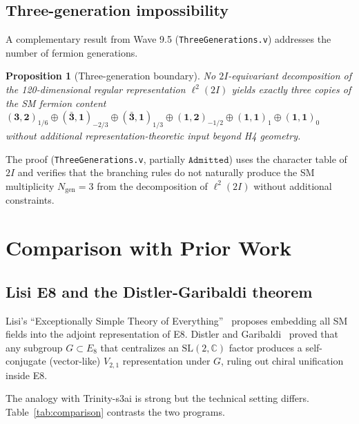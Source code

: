 \documentclass[12pt,a4paper]{article}
\newtheorem{proposition}[theorem]{Proposition}
\newcommand{\TwoI}{2I}
\newcommand{\Admitted}{\texttt{Admitted}}
\begin{document}
\subsection{Three-generation impossibility}
\label{sec:3gen}

A complementary result from Wave 9.5 (\texttt{ThreeGenerations.v}) addresses the
number of fermion generations.

\begin{proposition}[Three-generation boundary]
\label{prop:3gen}
No \(\TwoI\)-equivariant decomposition of the 120-dimensional regular representation
\(\ell^2(\TwoI)\) yields exactly three copies of the SM fermion content
\((\mathbf{3},\mathbf{2})_{1/6} \oplus (\bar{\mathbf{3}},\mathbf{1})_{-2/3}
\oplus (\bar{\mathbf{3}},\mathbf{1})_{1/3} \oplus (\mathbf{1},\mathbf{2})_{-1/2}
\oplus (\mathbf{1},\mathbf{1})_1 \oplus (\mathbf{1},\mathbf{1})_0\) without
additional representation-theoretic input beyond H4 geometry.
\end{proposition}

The proof (\texttt{ThreeGenerations.v}, partially \(\Admitted\)) uses the character table
of \(\TwoI\) and verifies that the branching rules do not naturally produce the SM multiplicity
\(N_{\mathrm{gen}} = 3\) from the decomposition of \(\ell^2(\TwoI)\) without additional
constraints.


\section{Comparison with Prior Work}
\label{sec:comparison}

\subsection{Lisi E8 and the Distler-Garibaldi theorem}

Lisi's ``Exceptionally Simple Theory of Everything''~\cite{Lisi:2007rx} proposes embedding
all SM fields into the adjoint representation of E8. Distler and Garibaldi~\cite{Distler:2009dm}
proved that any subgroup \(G \subset E_8\) that centralizes an \(\mathrm{SL}(2,\mathbb{C})\)
factor produces a self-conjugate (vector-like) \(V_{2,1}\) representation under \(G\),
ruling out chiral unification inside E8.

The analogy with Trinity-s3ai is strong but the technical setting differs. Table~\ref{tab:comparison}
contrasts the two programs.
\end{document}
